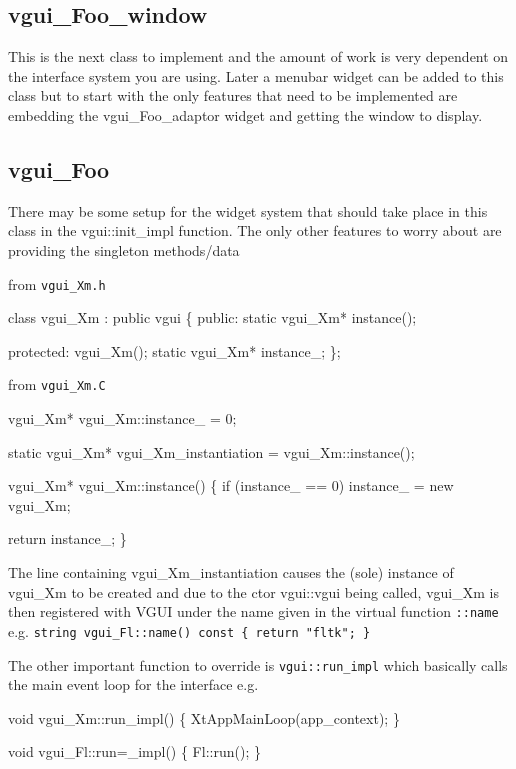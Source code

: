 \documentclass[12pt]{report} \usepackage{epsfig}
\begin{document}
\subsection{vgui\_Foo\_window}

This is the next class to implement and the amount of work is very dependent on the interface
system you are using.  Later a menubar widget can be added to this class but to start with
the only features that need to be implemented are embedding the  vgui\_Foo\_adaptor widget
and getting the window to display.

\subsection{vgui\_Foo}

There may be some setup for the widget system that should take place in this class in
the  vgui::init\_impl function.  The only other features to worry about are
providing the singleton methods/data

from {\tt vgui\_Xm.h}

{\scriptsize
\begin{verbawf}
  class vgui\_Xm : public vgui
  \{
   public:
    static vgui\_Xm* instance();

   protected:
    vgui\_Xm();
    static vgui\_Xm* instance\_;
  \};
\end{verbawf}
}

from {\tt vgui\_Xm.C}

{\scriptsize
\begin{verbawf}
  vgui\_Xm* vgui\_Xm::instance\_ = 0;

  static vgui\_Xm* vgui\_Xm\_instantiation = vgui\_Xm::instance();

  vgui\_Xm* vgui\_Xm::instance()
  \{
    if (instance\_ == 0)
      instance\_ = new vgui\_Xm;

    return instance\_;
  \}
\end{verbawf}
}

The line containing vgui\_Xm\_instantiation causes the (sole) instance of vgui\_Xm to be
created and due to the ctor  vgui::vgui being called, vgui\_Xm is then registered with
VGUI  under the name given in the virtual function {\tt ::name}
e.g.  {\tt string vgui\_Fl::name() const \{ return "fltk"; \} }

The other important function to override is {\tt vgui::run\_impl}
which basically calls the main event loop for the interface e.g.

{\scriptsize
\begin{verbawf}
  void vgui\_Xm::run\_impl()
  \{
    XtAppMainLoop(app\_context);
  \}

  void vgui\_Fl::run=\_impl()
  \{
    Fl::run();
  \}
\end{verbawf}
}
\end{document}
